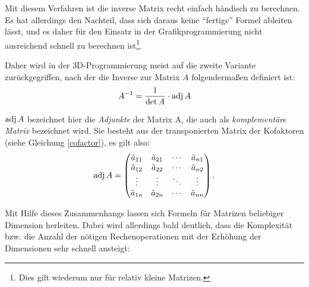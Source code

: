 Mit diesem Verfahren ist die inverse Matrix recht einfach händisch zu berechnen. Es hat allerdings den Nachteil, dass sich daraus keine \enquote{fertige} Formel ableiten lässt, und es daher für den Einsatz in der Grafikprogrammierung nicht ausreichend schnell zu berechnen ist\footnote{Dies gilt wiederum nur für relativ kleine Matrizen.}.

Daher wird in der 3D-Programmierung meist auf die zweite Variante zurückgegriffen, nach der die Inverse zur Matrix $A$ folgendermaßen definiert ist:
\begin{equation}
 A^{-1} = \frac{1}{\det A} \cdot \operatorname{adj}A
\end{equation}

$\operatorname{adj}A$ bezeichnet hier die \emph{Adjunkte} der Matrix A, die auch als \emph{komplementäre Matrix} bezeichnet wird. Sie besteht aus der transponierten Matrix der Kofaktoren (siehe Gleichung \ref{cofactor}), es gilt also:
\begin{equation}
 \operatorname{adj}A = \begin{pmatrix}
   \tilde a_{11} & \tilde a_{21} & \cdots & \tilde a_{n1}\\
   \tilde a_{12} & \tilde a_{22} & \cdots & \tilde a_{n2}\\
   \vdots & \vdots & \ddots & \vdots\\
   \tilde a_{1n} & \tilde a_{2n} & \cdots & \tilde a_{nn}
 \end{pmatrix}.
\end{equation}

Mit Hilfe dieses Zusammenhangs lassen sich Formeln für Matrizen beliebiger Dimension herleiten. Dabei wird allerdings bald deutlich, dass die Komplexität bzw. die Anzahl der nötigen Rechenoperationen mit der Erhöhung der Dimensionen sehr schnell ansteigt:

